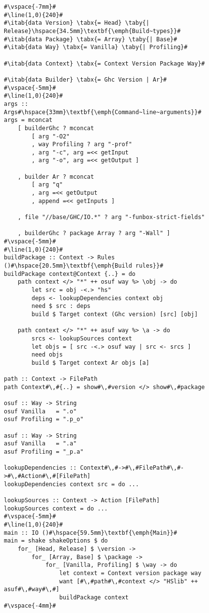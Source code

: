 \begin{figure}
\begin{lstlisting}
#\vspace{-7mm}#
#\line(1,0){240}#
#\itab{data Version} \tabx{= Head} \taby{| Release}\hspace{34.5mm}\textbf{\emph{Build~types}}#
#\itab{data Package} \tabx{= Array} \taby{| Base}#
#\itab{data Way} \tabx{= Vanilla} \taby{| Profiling}#

#\itab{data Context} \tabx{= Context Version Package Way}#

#\itab{data Builder} \tabx{= Ghc Version | Ar}#
#\vspace{-5mm}#
#\line(1,0){240}#
args :: Args#\hspace{33mm}\textbf{\emph{Command~line~arguments}}#
args = mconcat
    [ builderGhc ? mconcat
        [ arg "-O2"
        , way Profiling ? arg "-prof"
        , arg "-c", arg =<< getInput
        , arg "-o", arg =<< getOutput ]

    , builder Ar ? mconcat
        [ arg "q"
        , arg =<< getOutput
        , append =<< getInputs ]

    , file "//base/GHC/IO.*" ? arg "-funbox-strict-fields"

    , builderGhc ? package Array ? arg "-Wall" ]
#\vspace{-5mm}#
#\line(1,0){240}#
buildPackage :: Context -> Rules ()#\hspace{20.5mm}\textbf{\emph{Build rules}}#
buildPackage context@Context {..} = do
    path context </> "*" ++ osuf way %> \obj -> do
        let src = obj -<.> "hs"
        deps <- lookupDependencies context obj
        need $ src : deps
        build $ Target context (Ghc version) [src] [obj]

    path context </> "*" ++ asuf way %> \a -> do
        srcs <- lookupSources context
        let objs = [ src -<.> osuf way | src <- srcs ]
        need objs
        build $ Target context Ar objs [a]

path :: Context -> FilePath
path Context#\,#{..} = show#\,#version </> show#\,#package

osuf :: Way -> String
osuf Vanilla   = ".o"
osuf Profiling = ".p_o"

asuf :: Way -> String
asuf Vanilla   = ".a"
asuf Profiling = "_p.a"

lookupDependencies :: Context#\,#->#\,#FilePath#\,#->#\,#Action#\,#[FilePath]
lookupDependencies context src = do ...

lookupSources :: Context -> Action [FilePath]
lookupSources context = do ...
#\vspace{-5mm}#
#\line(1,0){240}#
main :: IO ()#\hspace{59.5mm}\textbf{\emph{Main}}#
main = shake shakeOptions $ do
    for_ [Head, Release] $ \version ->
        for_ [Array, Base] $ \package ->
            for_ [Vanilla, Profiling] $ \way -> do
                let context = Context version package way
                want [#\,#path#\,#context </> "HSlib" ++ asuf#\,#way#\,#]
                buildPackage context
#\vspace{-4mm}#
\end{lstlisting}


\end{figure}

